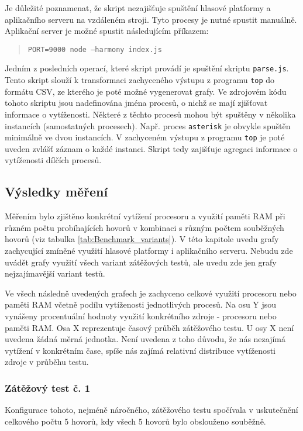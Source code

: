 \documentclass[ing,male,java,dept460,twoside]{diploma}						%
\begin{document}
Je důležité poznamenat, že skript nezajišťuje spuštění hlasové platformy a aplikačního serveru na vzdáleném stroji. Tyto procesy je nutné spustit manuálně. Aplikační server je možné spustit následujícím příkazem:

\begin{quote}
	\texttt{PORT=9000 node --harmony index.js}
\end{quote}

Jedním z posledních operací, které skript provádí je spuštění skriptu \texttt{parse.js}. Tento skript slouží k transformaci zachyceného výstupu z programu \texttt{top} do formátu CSV, ze kterého je poté možné vygenerovat grafy. Ve zdrojovém kódu tohoto skriptu jsou nadefinována jména procesů, o nichž se mají zjišťovat informace o vytíženosti. Některé z těchto procesů mohou být spuštěny v několika instancích (samostatných procesech). Např. proces \texttt{asterisk} je obvykle spuštěn minimálně ve dvou instancích. V zachyceném výstupu z programu \texttt{top} je poté uveden zvlášť záznam o každé instanci. Skript tedy zajišťuje agregaci informace o vytíženosti dílčích procesů.

\subsection{Výsledky měření}
\label{sec:Benchmark_results}
Měřením bylo zjištěno konkrétní vytížení procesoru a využití paměti RAM při různém počtu probíhajících hovorů v kombinaci s různým počtem souběžných hovorů (viz tabulka \ref{tab:Benchmark_variants}). V této kapitole uvedu grafy zachycující zmíněné využití hlasové platformy i aplikačního serveru. Nebudu zde uvádět grafy využití všech variant zátěžových testů, ale uvedu zde jen grafy nejzajímavější variant testů.

Ve všech následně uvedených grafech je zachyceno celkové využití procesoru nebo paměti RAM včetně podílu vytíženosti jednotlivých procesů. Na osu Y jsou vynášeny procentuální hodnoty využití konkrétního zdroje - procesoru nebo paměti RAM. Osa X reprezentuje časový průběh zátěžového testu. U osy X není uvedena žádná měrná jednotka. Není uvedena z toho důvodu, že nás nezajímá vytížení v konkrétním čase, spíše nás zajímá relativní distribuce vytíženosti zdroje v průběhu testu.

\subsubsection{Zátěžový test č. 1}
Konfigurace tohoto, nejméně náročného, zátěžového testu spočívala v uskutečnění celkového počtu 5 hovorů, kdy všech 5 hovorů bylo obslouženo souběžně.
\end{document}

